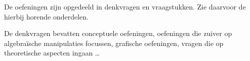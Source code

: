 \documentclass{ximera}
\begin{document}
	\author{Bart Lambregs}
    \xmsource\xmuitleg

De oefeningen zijn opgedeeld in denkvragen en vraagstukken. Zie daarvoor de hierbij horende onderdelen.

De denkvragen bevatten conceptuele oefeningen, oefeningen die zuiver op algebra\"ische manipulaties focussen, grafische oefeningen, vragen die op theoretische aspecten ingaan \ldots
\end{document}
